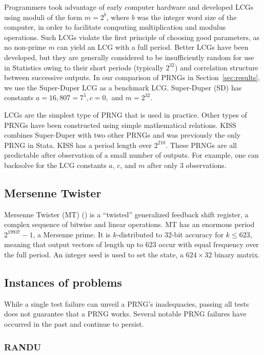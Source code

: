 \documentclass[12pt]{article}
\newcommand{\todo}[1]{{\color{red}{TO DO: \sc #1}}}
\begin{document}
Programmers took advantage of early computer hardware and developed LCGs using moduli of the form $m = 2^b$, where
$b$ was the integer word size of the computer, in order to facilitate computing multiplication and modulus operations.
Such LCGs violate the first principle of choosing good parameters, as no non-prime $m$ can yield an LCG with a full period.
Better LCGs have been developed, but they are generally considered to be insufficiently random for use in Statistics owing to their short periods (typically $2^{32}$) and correlation structure between successive outputs.
In our comparison of PRNGs in Section~\ref{sec:results}, we use the Super-Duper LCG as a benchmark LCG. \todo{cite}
Super-Duper (SD) has constants $a=16,807 = 7^5, c=0,$ and $m = 2^{32}$.

LCGs are the simplest type of PRNG that is used in practice.
Other types of PRNGs have been constructed using simple mathematical relations.
KISS combines Super-Duper with two other PRNGs and was previously the only PRNG in Stata. 
KISS has a period length over $2^{210}$.
\todo{Mention lagged fibonacci sequences, xorshift}
These PRNGs are all predictable after observation of a small number of outputs.
For example, one can backsolve for the LCG constants $a$, $c$, and $m$ after only 3 observations.

\subsection{Mersenne Twister}
Mersenne Twister (MT) (\cite{matsumoto_mersenne_1998}) is a ``twisted'' generalized feedback shift register, a complex sequence of bitwise and linear operations.
MT has an enormous period $2^{19937}-1$, a Mersenne prime.
It is $k$-distributed to $32$-bit accuracy for $k \leq 623$, meaning that output vectors of length up to $623$ occur with equal frequency over the full period.
An integer seed is used to set the state, a $624 \times 32$ binary matrix.

\subsection{Instances of problems}
While a single test failure can unveil a PRNG's inadequacies, passing all tests does not guarantee that a PRNG works.
Several notable PRNG failures have occurred in the past and continue to persist.
 
\subsubsection{RANDU}
\end{document}
